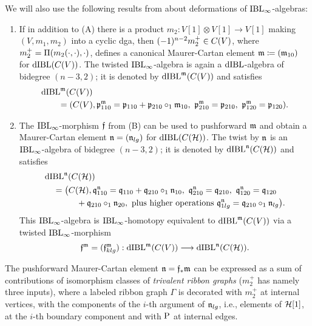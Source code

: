 \documentclass[\MainFolder/Text.tex]{subfiles}
\begin{document}
We will also use the following results from \cite[Proposition~12.5 and Theorem~12.9]{Cieliebak2015} about deformations of $\mathrm{IBL}_\infty$-algebras:
\begin{enumerate}[resume,listparindent=\parindent,label=\textbf{(\Alph*)}]
 \item If in addition to (A) there is a product $m_2 : V[1]\otimes V[1] \rightarrow V[1]$ making $(V,m_1,m_2)$ into a cyclic dga, then $(-1)^{n-2} m_2^+\in C(V)$, where $m_2^+ = \Pi(m_2(\cdot,\cdot),\cdot)$, defines a canonical Maurer-Cartan element $\mathfrak{m}\coloneqq(\mathfrak{m}_{10})$ for $\mathrm{dIBL}(C(V))$.
The twisted $\mathrm{IBL}_\infty$-algebra is again a $\mathrm{dIBL}$-algebra of bidegree $(n-3,2)$; it is denoted by $\mathrm{dIBL}^{\mathfrak{m}}(C(V))$ and satisfies
\begin{equation} \label{Eq:CanonMCTwist}
\begin{aligned}
&\dIBL^\MC(\CycC(V)) \\ 
&\qquad = (\CycC(V),\OPP^\MC_{110}=\OPP_{110}+\OPP_{210}\circ_1\MC_{10},\ \OPP^\MC_{210}=\OPP_{210},\ \OPP^\MC_{120} = \OPP_{120}).
\end{aligned}
\end{equation}
\item The $\mathrm{IBL}_\infty$-morphism $\mathfrak{f}$ from (B) can be used to pushforward $\mathfrak{m}$ and obtain a Maurer-Cartan element $\mathfrak{n} = (\mathfrak{n}_{lg})$ for $\mathrm{dIBL}(C(\mathcal{H}))$.
The twist by $\mathfrak{n}$ is an $\mathrm{IBL}_\infty$-algebra of bidegree $(n-3,2)$; it is denoted by $\mathrm{dIBL}^{\mathfrak{n}}(C(\mathcal{H}))$ and satisfies
\[\begin{aligned}
& \dIBL^\PMC(\CycC(\Harm)) \\
& \quad = \begin{multlined}[t]
\bigl(\CycC(\Harm), \OPQ_{110}^\PMC = \OPQ_{110} + \OPQ_{210}\circ_1 \PMC_{10},\ \OPQ_{210}^\PMC=\OPQ_{210},\ \OPQ_{120}^\PMC = \OPQ_{120} \\+ \OPQ_{210} \circ_1 \PMC_{20},
\text{ plus higher operations }\OPQ_{1lg}^\PMC = \OPQ_{210}\circ_1 \PMC_{lg} \bigr).
\end{multlined} \end{aligned} \]
This $\mathrm{IBL}_\infty$-algebra is $\mathrm{IBL}_\infty$-homotopy equivalent to $\mathrm{dIBL}^{\mathfrak{m}}(C(V))$ via a twisted $\mathrm{IBL}_\infty$-morphism 
\[\mathfrak{f}^{\mathfrak{m}}=(\mathfrak{f}^{\mathfrak{m}}_{klg}): \mathrm{dIBL}^{\mathfrak{m}}(C(V)) \longrightarrow \mathrm{dIBL}^{\mathfrak{n}}(C(\mathcal{H})). \]
\end{enumerate}

The pushforward Maurer-Cartan element $\mathfrak{n} = \mathfrak{f}_* \mathfrak{m}$ can be expressed as a sum of contributions of isomorphism classes of \emph{trivalent ribbon graphs} ($m_2^+$ has namely three inputs), where a labeled ribbon graph $\Gamma$ is decorated with $m_2^+$ at internal vertices, with the components of the $i$-th argument of $\mathfrak{n}_{lg}$, i.e., elements of $\mathcal{H}[1]$, at the $i$-th boundary component and with $\mathrm{P}$ at internal edges.
\end{document}
